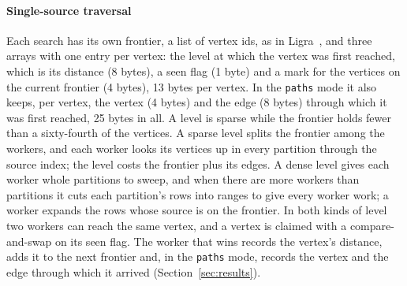 \paragraph{Single-source traversal} Each search has its own frontier, a list of vertex ids, as in
Ligra~\cite{shun2013ligra}, and three arrays with one entry per vertex: the level at which the vertex was first
reached, which is its distance (8 bytes), a seen flag (1 byte) and a mark for the vertices on the current frontier
(4 bytes), 13 bytes per vertex. In the \texttt{paths} mode it also keeps, per vertex, the vertex (4 bytes) and the edge
(8 bytes) through which it was first reached, 25 bytes in all. A level is sparse while the frontier holds fewer than a
sixty-fourth of the vertices. A sparse level splits the frontier among the workers, and each worker looks its
vertices up in every partition through the source index; the level costs the frontier plus its edges. A dense level
gives each worker whole partitions to sweep, and when there are more workers than partitions it cuts each partition's
rows into ranges to give every worker work; a worker expands the rows whose source is on the frontier. In both
kinds of level two workers can reach the same vertex, and a vertex is claimed with a compare-and-swap on its seen
flag. The worker that wins records the vertex's distance, adds it to the next frontier and, in the \texttt{paths}
mode, records the vertex and the edge through which it arrived (Section~\ref{sec:results}).

